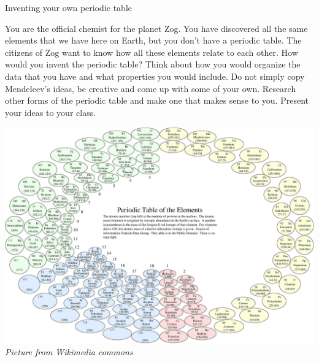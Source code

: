 \begin{activity}{Inventing your own periodic table}
            \nopagebreak
            \label{m38760*eip-603}
\begin{minipage}{.5\textwidth}
You are the official chemist for the planet Zog. You have discovered all the same elements that we have here on Earth, but you don't have a periodic table. The citizens of Zog want to know how all these elements relate to each other. How would you invent the periodic table? Think about how you would organize the data that you have and what properties you would include. Do not simply copy Mendeleev's ideas, be creative and come up with some of your own. Research other forms of the periodic table and make one that makes sense to you. Present your ideas to your class. 
\end{minipage}
\begin{minipage}{.5\textwidth}
\begin{center}
\includegraphics[width=.8\textwidth]{photos/Circular_periodic_table.png}\\
\textsl{Picture from Wikimedia commons}
\end{center}
\end{minipage}

\end{activity}
